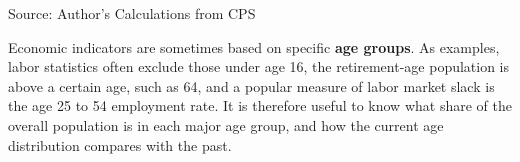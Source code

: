 \documentclass{report}
\makeatletter
\newcommand{\tbllink}[1]{\href{https://raw.githubusercontent.com/bdecon/US-chartbook/master/chartbook/data/#1}{\faTable}}
\newcommand*\short[1]{\expandafter\@gobbletwo\number\numexpr#1\relax}
\newcommand{\absnode}[3]{\node[below right, align=left] at (axis cs: #1,#2) {#3};}
\newcommand{\shdateaxisticks}{
		date coordinates in=x, axis line style={draw=none},
		xmax={2023-11-01},
		max space between ticks=40,	    
		xtick={{1990-01-01}, {1995-01-01}, {2000-01-01}, 
			{2005-01-01}, {2010-01-01}, {2015-01-01}, {2020-01-01}},
		minor xtick={},
		enlarge y limits={0.06}, enlarge x limits={0.01},
		}
\newcommand{\bbar}[2]{extra #1 ticks = {{#2}}, extra #1 tick labels = ,
		extra #1 tick style = {grid=major, grid style={thick, black!25}},}
\newcommand{\stdline}[4]{\addplot[very thick, no markers, color=#1] 
		table [x=#2, y=#3, col sep=comma] {#4};	}
\newcommand{\rbars}{
		\fill[color=black!10] (axis cs:{1990-07-01},\pgfkeysvalueof{/pgfplots/ymin}) rectangle 
			(axis cs:{1991-03-01}, \pgfkeysvalueof{/pgfplots/ymax});
		\fill[color=black!10] (axis cs:{2007-12-01},\pgfkeysvalueof{/pgfplots/ymin}) rectangle 
			(axis cs:{2009-07-01}, \pgfkeysvalueof{/pgfplots/ymax});
		\fill[color=black!10] (axis cs:{2001-03-01},\pgfkeysvalueof{/pgfplots/ymin}) rectangle 
			(axis cs:{2001-11-01}, \pgfkeysvalueof{/pgfplots/ymax});
		\fill[color=black!10] (axis cs:{2020-02-01},\pgfkeysvalueof{/pgfplots/ymin}) rectangle 
			(axis cs:{2020-05-01}, \pgfkeysvalueof{/pgfplots/ymax});}
\makeatother
\begin{document}
{\begin{minipage}{0.76\textwidth}
\begin{minipage}{0.53\textwidth}
\hspace{2mm} 

\footnotesize{Source: Author's Calculations from CPS} \hfill \tbllink{median_age.csv}
\end{minipage}
\vspace{3mm}

\small Economic indicators are sometimes based on specific \textbf{age groups}. As examples, labor statistics often exclude those under age 16, the retirement-age population is above a certain age, such as 64, and a popular measure of labor market slack is the age 25 to 54 employment rate. It is therefore useful to know what share of the overall population is in each major age group, and how the current age distribution compares with the past. 
\end{minipage}
\vspace{0.5mm}

}
\end{document}

